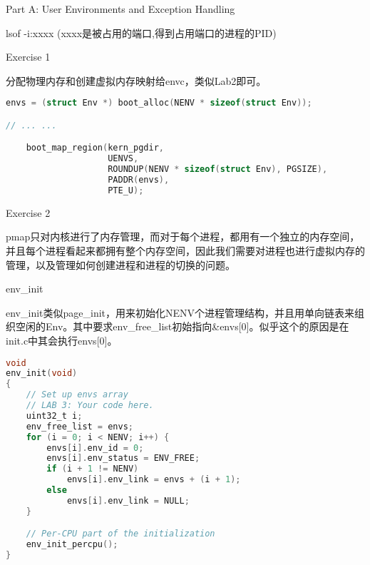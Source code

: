 \documentclass[GBK,winfonts,a4paper,10pt]{ctexart}
\begin{document}
\begin{section}{ Part A: User Environments and Exception Handling }
\par
lsof -i:xxxx    (xxxx是被占用的端口,得到占用端口的进程的PID)

\begin{subsection}{ Exercise 1 }
\par
分配物理内存和创建虚拟内存映射给envc，类似Lab2即可。
\begin{lstlisting}[language=C]
	envs = (struct Env *) boot_alloc(NENV * sizeof(struct Env));

// ... ...

    boot_map_region(kern_pgdir,
                    UENVS,
                    ROUNDUP(NENV * sizeof(struct Env), PGSIZE),
                    PADDR(envs),
                    PTE_U);
\end{lstlisting}
\end{subsection}

\begin{subsection}{ Exercise 2 }
\par
pmap只对内核进行了内存管理，而对于每个进程，都用有一个独立的内存空间，并且每个进程看起来都拥有整个内存空间，因此我们需要对进程也进行虚拟内存的管理，以及管理如何创建进程和进程的切换的问题。

\begin{subsubsection}{env\_init}
\par
env\_init类似page\_init，用来初始化NENV个进程管理结构，并且用单向链表来组织空闲的Env。其中要求env\_free\_list初始指向\&envs[0]。似乎这个的原因是在init.c中其会执行envs[0]。
\begin{lstlisting}[language=C]
void
env_init(void)
{
	// Set up envs array
	// LAB 3: Your code here.
    uint32_t i;
    env_free_list = envs;
    for (i = 0; i < NENV; i++) {
        envs[i].env_id = 0;
        envs[i].env_status = ENV_FREE;
        if (i + 1 != NENV)
            envs[i].env_link = envs + (i + 1);
        else 
            envs[i].env_link = NULL;
    }

	// Per-CPU part of the initialization
	env_init_percpu();
}
\end{lstlisting}
\end{subsubsection}


\end{subsection}
\end{section}
\end{document}

